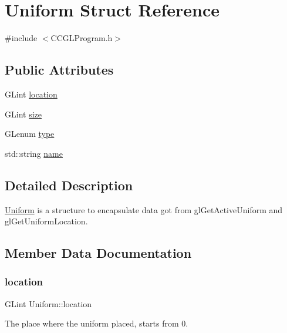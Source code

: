 \hypertarget{structUniform}{}\section{Uniform Struct Reference}
\label{structUniform}


{\ttfamily \#include $<$C\+C\+G\+L\+Program.\+h$>$}

\subsection*{Public Attributes}
\begin{DoxyCompactItemize}
\item 
G\+Lint \hyperlink{structUniform_a2926f5e10fec44216c4d14731c3a7349}{location}
\item 
G\+Lint \hyperlink{structUniform_abfed1e4030d5ab97cb82b2311e573351}{size}
\item 
G\+Lenum \hyperlink{structUniform_a28656c9eb79454c6f92f87b6f6917784}{type}
\item 
std\+::string \hyperlink{structUniform_aec5d81609539a9cf34d448e9da5d1313}{name}
\end{DoxyCompactItemize}


\subsection{Detailed Description}
\hyperlink{structUniform}{Uniform} is a structure to encapsulate data got from gl\+Get\+Active\+Uniform and gl\+Get\+Uniform\+Location. 

\subsection{Member Data Documentation}
\mbox{\label{structUniform_a2926f5e10fec44216c4d14731c3a7349}} 
\subsubsection{\texorpdfstring{location}{location}}
{\footnotesize\ttfamily G\+Lint Uniform\+::location}

The place where the uniform placed, starts from 0. \mbox{\label{structUniform_aec5d81609539a9cf34d448e9da5d1313}} 
